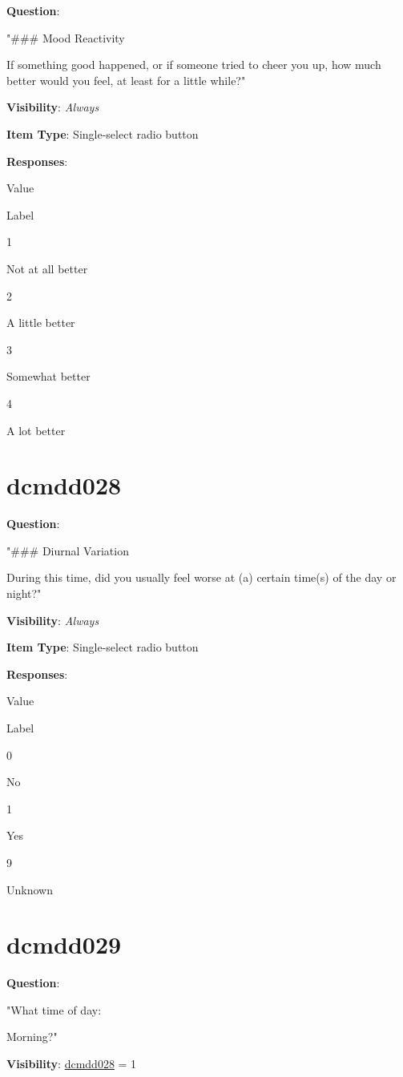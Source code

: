 \documentclass[
]{book}
\begin{document}
\textbf{Question}:

"\#\#\# Mood Reactivity

If something good happened, or if someone tried to cheer you up, how much better would you feel, at least for a little while?"

\textbf{Visibility}: \emph{Always}

\textbf{Item Type}: Single-select radio button

\textbf{Responses}:

Value

Label

1

Not at all better

2

A little better

3

Somewhat better

4

A lot better

\hypertarget{dcmdd028}{%
\section{dcmdd028}\label{dcmdd028}}

\textbf{Question}:

"\#\#\# Diurnal Variation

During this time, did you usually feel worse at (a) certain time(s) of the day or night?"

\textbf{Visibility}: \emph{Always}

\textbf{Item Type}: Single-select radio button

\textbf{Responses}:

Value

Label

0

No

1

Yes

9

Unknown

\hypertarget{dcmdd029}{%
\section{dcmdd029}\label{dcmdd029}}

\textbf{Question}:

"What time of day:

Morning?"

\textbf{Visibility}: \protect\hyperlink{dcmdd028}{dcmdd028} = 1
\end{document}
